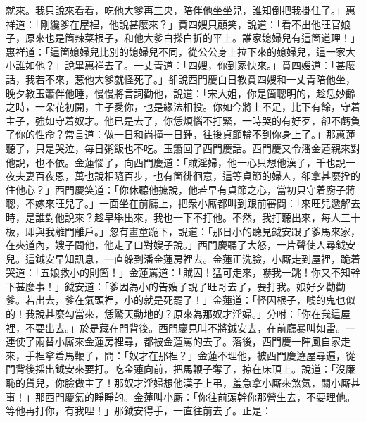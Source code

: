 就來。我只說來看看，吃他大爹再三央，陪伴他坐坐兒，誰知倒把我掛住了。」惠祥道：「剛纔爹在屋裡，他說甚麼來？」賁四嫂只顧笑，說道：「看不出他旺官娘子，原來也是箇辣菜根子，{}和他大爹白搽白折的平上。誰家媳婦兒有這箇道理！」惠祥道：「這箇媳婦兒比別的媳婦兒不同，從公公身上拉下來的媳婦兒，{}這一家大小誰如他？」說畢惠祥去了。一丈青道：「四嫂，你到家快來。」賁四嫂道：「甚麼話，我若不來，惹他大爹就怪死了。」卻說西門慶白日教賁四嫂和一丈青陪他坐，晚夕教玉簫伴他睡，慢慢將言詞勸他，說道：「宋大姐，你是箇聰明的，趁恁妙齡之時，一朵花初開，主子愛你，也是緣法相投。你如今將上不足，比下有餘，守着主子，強如守着奴才。他已是去了，你恁煩惱不打緊，一時哭的有好歹，卻不虧負了你的性命？常言道：做一日和尚撞一日鍾，往後貞節輪不到你身上了。」{}那蕙蓮聽了，只是哭泣，每日粥飯也不吃。{}玉簫回了西門慶話。西門慶又令潘金蓮親來對他說，也不依。金蓮惱了，向西門慶道：「賊淫婦，他一心只想他漢子，千也說一夜夫妻百夜恩，萬也說相隨百步，也有箇徘徊意，這等貞節的婦人，卻拿甚麼拴的住他心？」西門慶笑道：「你休聽他摭說，他若早有貞節之心，當初只守着廚子蔣聰，不嫁來旺兒了。」{}一面坐在前廳上，把衆小厮都叫到跟前審問：「來旺兒遞解去時，是誰對他說來？趁早舉出來，我也一下不打他。不然，我打聽出來，每人三十板，即與我離門離戶。」忽有畫童跪下，說道：「那日小的聽見鉞安跟了爹馬來家，在夾道內，嫂子問他，他走了口對嫂子說。」西門慶聽了大怒，一片聲使人尋鉞安兒。這鉞安早知訊息，一直躲到潘金蓮房裡去。金蓮正洗臉，小厮走到屋裡，跪着哭道：「五娘救小的則箇！」金蓮罵道：「賊囚！猛可走來，嚇我一跳！你又不知幹下甚麼事！」鉞安道：「爹因為小的告嫂子說了旺哥去了，要打我。娘好歹勸勸爹。若出去，爹在氣頭裡，小的就是死罷了！」金蓮道：「怪囚根子，唬的鬼也似的！我說甚麼勾當來，恁驚天動地的？原來為那奴才淫婦。」分咐：「你在我這屋裡，不要出去。」於是藏在門背後。西門慶見叫不將鉞安去，在前廳暴叫如雷。一連使了兩替小厮來金蓮房裡尋，都被金蓮罵的去了。落後，西門慶一陣風自家走來，手裡拿着馬鞭子，問：「奴才在那裡？」金蓮不理他，被西門慶遶屋尋遍，從門背後採出鉞安來要打。吃金蓮向前，把馬鞭子奪了，掠在床頂上。{}說道：「沒廉恥的貨兒，你臉做主了！那奴才淫婦想他漢子上弔，羞急拿小厮來煞氣，關小厮甚事！」那西門慶氣的睜睜的。{}金蓮叫小厮：「你往前頭幹你那營生去，不要理他。等他再打你，有我哩！」那鉞安得手，一直往前去了。正是：

